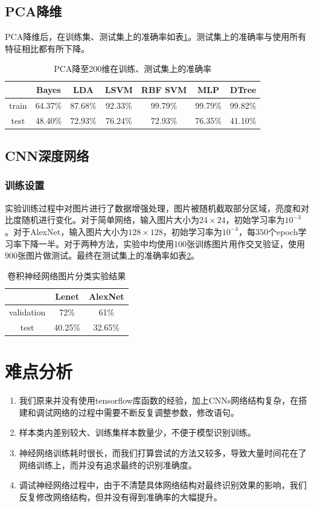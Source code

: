 \subsection{PCA降维}
PCA降维后，在训练集、测试集上的准确率如表\ref{tab:PCA}。测试集上的准确率与使用所有特征相比都有所下降。

\begin{table}[htbp]
\centering
\begin{tabular}{ccccccc}
\toprule
{} &   Bayes &     LDA &    LSVM & RBF SVM &     MLP &   DTree \\
\midrule
train &  64.37\% &  87.68\% &  92.33\% &  99.79\% &  99.79\% &  99.82\% \\
test  &  48.40\% &  72.93\% &  76.24\% &  72.93\% &  76.35\% &  41.10\% \\
\bottomrule
\end{tabular}
\caption{PCA降至200维在训练、测试集上的准确率}
\label{tab:PCA}
\end{table}

\subsection{CNN深度网络}
\subsubsection{训练设置}
实验训练过程中对图片进行了数据增强处理，图片被随机截取部分区域，亮度和对比度随机进行变化。对于简单网络，输入图片大小为$24\times 24$，初始学习率为$10^{-3}$。对于AlexNet，输入图片大小为$128\times 128$，初始学习率为$10^{-4}$，每$350$个epoch学习率下降一半。对于两种方法，实验中均使用100张训练图片用作交叉验证，使用$900$张图片做测试。最终在测试集上的准确率如表\ref{tab:CNN}。

\begin{table}[htbp]
\centering
\begin{tabular}{ccc}
\toprule
{} &   Lenet &     AlexNet \\
\midrule
validation &  72\% & 61\% \\
test  &  40.25\% &  32.65\% \\
\bottomrule
\end{tabular}
\caption{卷积神经网络图片分类实验结果}
\label{tab:CNN}
\end{table}

\section{难点分析}
\begin{enumerate}
\item 我们原来并没有使用tensorflow库函数的经验，加上CNNs网络结构复杂，在搭建和调试网络的过程中需要不断反复调整参数，修改语句。
\item 样本类内差别较大、训练集样本数量少，不便于模型识别训练。
\item 神经网络训练耗时很长，而我们打算尝试的方法又较多，导致大量时间花在了网络训练上，而并没有追求最终的识别准确度。
\item 调试神经网络过程中，由于不清楚具体网络结构对最终识别效果的影响，我们反复修改网络结构，但并没有得到准确率的大幅提升。

\end{enumerate}

